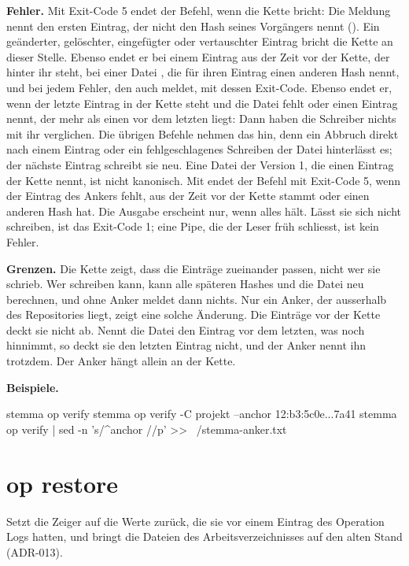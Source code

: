 {\bf Fehler.} Mit Exit-Code 5 endet der Befehl, wenn die Kette bricht: Die Meldung nennt den
ersten Eintrag, der nicht den Hash seines Vorgängers nennt
(). Ein geänderter, gelöschter,
eingefügter oder vertauschter Eintrag bricht die Kette an dieser Stelle. Ebenso endet er bei
einem Eintrag aus der Zeit vor der Kette, der hinter ihr steht, bei einer Datei
, die für ihren Eintrag einen anderen Hash nennt, und bei jedem Fehler, den
auch  meldet, mit dessen Exit-Code.
Ebenso endet er, wenn der letzte Eintrag in der Kette steht und
die Datei  fehlt oder einen Eintrag nennt, der mehr als einen vor dem
letzten liegt: Dann haben die Schreiber nichts mit ihr verglichen. Die übrigen Befehle nehmen
das hin, denn ein Abbruch direkt nach einem Eintrag oder ein fehlgeschlagenes Schreiben der
Datei hinterlässt es; der nächste Eintrag schreibt sie neu. Eine Datei  der
Version 1, die einen Eintrag der Kette nennt, ist nicht kanonisch. Mit  endet
der Befehl mit Exit-Code 5, wenn der Eintrag des Ankers fehlt, aus der Zeit vor der Kette
stammt oder einen anderen Hash hat. Die Ausgabe erscheint nur, wenn alles hält. Lässt sie
sich nicht schreiben, ist das Exit-Code 1; eine Pipe, die der Leser früh schliesst, ist kein
Fehler.

{\bf Grenzen.} Die Kette zeigt, dass die Einträge zueinander passen, nicht wer sie schrieb.
Wer  schreiben kann, kann alle späteren Hashes und die Datei 
neu berechnen, und  ohne Anker meldet dann nichts. Nur ein Anker, der
ausserhalb des Repositories liegt, zeigt eine solche Änderung. Die Einträge vor der Kette
deckt sie nicht ab.
Nennt die Datei  den Eintrag vor dem letzten, was  noch
hinnimmt, so deckt sie den letzten Eintrag nicht, und der Anker nennt ihn trotzdem.
Der Anker hängt allein an der Kette.

{\bf Beispiele.}

\starttyping
stemma op verify
stemma op verify -C projekt --anchor 12:b3:5c0e...7a41
stemma op verify | sed -n 's/^anchor //p' >> ~/stemma-anker.txt
\stoptyping

\section{op restore}

Setzt die Zeiger auf die Werte zurück, die sie vor einem Eintrag des Operation Logs
hatten, und bringt die Dateien des Arbeitsverzeichnisses auf den alten Stand (ADR-013).

